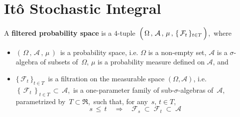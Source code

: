 

\section{It\^{o} Stochastic Integral}
\setcounter{theorem}{0}
\setcounter{equation}{0}


\renewcommand{\theenumi}{\roman{enumi}}
\renewcommand{\labelenumi}{\textnormal{(\theenumi)}$\;\;$}


\begin{definition}
\mbox{}
\vskip 0.1cm
\noindent
A \textbf{filtered probability space} is a $4$-tuple
\,$\left(\,\overset{{\color{white}.}}{\Omega} \,,\, \mathcal{A} \,,\, \mu \,,\, \{\,\mathcal{F}_{t}\,\}_{t \in T} \,\right)$,\,
where
\begin{itemize}
\item
	$\left(\,\Omega \,,\, \mathcal{A} \,,\, \mu \,\right)$\, is a probability space, i.e.
	$\Omega$ is a non-empty set, $\mathcal{A}$ is a $\sigma$-algebra of subsets of \,$\Omega$,
	$\mu$ is a probability measure defined on $\mathcal{A}$, and
\item
	$\{\,\mathcal{F}_{t}\,\}_{t \in T}$\, is a filtration on the measurable space $(\Omega,\mathcal{A})$, i.e.
	\,$\left\{\,\mathcal{F}_{t}\,\right\}_{t \in T} \,\subset\, \mathcal{A}$,\,
	is a one-parameter family of sub-$\sigma$-algebras of \,$\mathcal{A}$,\,
	parametrized by \,$T \subset \Re$,\,
	such that, for any \,$s,\, t \in T$,
	\begin{equation*}
	s \,\leq\, t
	\quad\Longrightarrow\quad
	\mathcal{F}_{s} \; \subset \; \mathcal{F}_{t} \; \subset \; \mathcal{A}
	\end{equation*}
\end{itemize}
\end{definition}


